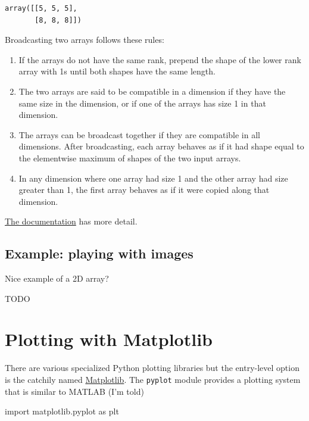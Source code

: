 \documentclass[
  letterpaper,
  DIV=11,
  numbers=noendperiod]{scrreprt}
\newenvironment{Shaded}{\begin{snugshade}}{\end{snugshade}}
\newcommand{\ImportTok}[1]{\textcolor[rgb]{0.00,0.46,0.62}{#1}}
\newcommand{\NormalTok}[1]{\textcolor[rgb]{0.00,0.23,0.31}{#1}}
\theoremstyle{definition}
\theoremstyle{remark}
\begin{document}
\begin{verbatim}
array([[5, 5, 5],
       [8, 8, 8]])
\end{verbatim}

Broadcasting two arrays follows these rules:

\begin{enumerate}
\def\labelenumi{\arabic{enumi}.}
\item
  If the arrays do not have the same rank, prepend the shape of the
  lower rank array with 1s until both shapes have the same length.
\item
  The two arrays are said to be compatible in a dimension if they have
  the same size in the dimension, or if one of the arrays has size 1 in
  that dimension.
\item
  The arrays can be broadcast together if they are compatible in all
  dimensions. After broadcasting, each array behaves as if it had shape
  equal to the elementwise maximum of shapes of the two input arrays.
\item
  In any dimension where one array had size 1 and the other array had
  size greater than 1, the first array behaves as if it were copied
  along that dimension.
\end{enumerate}

\href{https://numpy.org/doc/stable/user/basics.broadcasting.html}{The
documentation} has more detail.

\hypertarget{example-playing-with-images}{%
\subsection{Example: playing with
images}\label{example-playing-with-images}}

Nice example of a 2D array?

TODO

\hypertarget{plotting-with-matplotlib}{%
\section{Plotting with Matplotlib}\label{plotting-with-matplotlib}}

There are various specialized Python plotting libraries but the
entry-level option is the catchily named
\href{https://matplotlib.org/}{Matplotlib}. The \texttt{pyplot} module
provides a plotting system that is similar to MATLAB (I'm told)

\begin{Shaded}
\begin{Highlighting}[]
\ImportTok{import}\NormalTok{ matplotlib.pyplot }\ImportTok{as}\NormalTok{ plt}
\end{Highlighting}
\end{Shaded}
\end{document}
